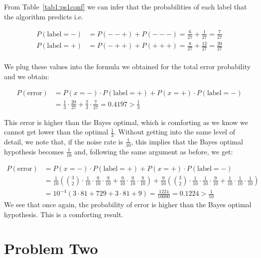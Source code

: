 \documentclass{article}
\begin{document}
From Table~\ref{tab1:ps1conf} we can infer that the probabilities of each label that the algorithm predicts i.e.

\begin{align*}
P(\text{label}=-) &= P(--+)+P(---) = \frac{6}{27} +\frac{1}{27} = \frac{7}{27}\\
P(\text{label}=+) &= P(-++)+P(+++) = \frac{8}{27} +\frac{12}{27} = \frac{20}{27}\\
\end{align*} 

%

We plug these values into the formula we obtained for the total error probability and we obtain:

\begin{align*}
P(\text{error}) &= P(x=-)\cdot P(\text{label}= +) + P(x=+)\cdot P(\text{label}= -)\\
&=\frac{1}{3}\cdot\frac{20}{27} + \frac{2}{3}\cdot\frac{7}{27}=0.4197 >\frac{1}{3}
\end{align*}

This error is higher than the Bayes optimal, which is comforting as we know we cannot get lower than the optimal $\frac{1}{3}$. Without getting into the same level of detail, we note that, if the noise rate is $\frac{1}{10}$, this implies that the Bayes optimal hypothesis becomes $\frac{1}{10}$ and, following the same argument as before, we get:

\begin{align*}
P(\text{error})&=P(x=-)\cdot P(\text{label}= +) + P(x=+)\cdot P(\text{label}= -)\\
&=\frac{1}{10}\left(\binom{3}{2}\cdot\frac{1}{10}\cdot\frac{9}{10}\cdot\frac{9}{10}+\frac{9}{10}\cdot\frac{9}{10}\cdot\frac{9}{10}\right)+\frac{9}{10}\left(\binom{3}{2}\cdot\frac{1}{10}\cdot\frac{1}{10}\cdot\frac{9}{10}+\frac{1}{10}\cdot\frac{1}{10}\cdot\frac{1}{10}\right)\\
&=10^{-4}\left(3\cdot 81+729+3\cdot 81+9\right)=\frac{1224}{10000}=0.1224>\frac{1}{10}
\end{align*}
We see that once again, the probability of error is higher than the Bayes optimal hypothesis. This is a comforting result.
\clearpage

\section{Problem Two}
\end{document}
